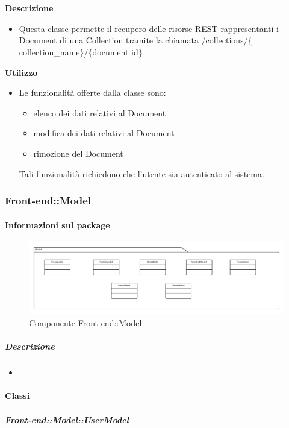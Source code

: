 \begin{itemize}
        \textbf{\\ \\ Descrizione} 
          \begin{itemize}
            \item[] Questa classe permette il recupero delle risorse REST rappresentanti i Document di una Collection tramite la chiamata /collections/$\{$collection_name$\}$/$\{$document id$\}$
          \end{itemize}      
        \textbf{Utilizzo}  
          \begin{itemize}
            \item[] Le funzionalità offerte dalla classe sono: 
\begin{itemize} 
\item elenco dei dati relativi al Document 
\item modifica dei dati relativi al Document
\item rimozione del Document 
\end{itemize} 
Tali funzionalità richiedono che l'utente sia autenticato al sistema.
          \end{itemize}
  \subsubsection{Front-end::Model}
  \paragraph{Informazioni sul package}
    \begin{figure}[H] 
      \begin{center} 
        \includegraphics[width=\textwidth]{packages/Front-end::Model.png}  
        \caption{Componente Front-end::Model}
      \end{center}  
    \end{figure} 
  \subparagraph{Descrizione} 
    \begin{itemize}
    \item[] 
    \end{itemize} 
    \paragraph{Classi}
      \subparagraph{Front-end::Model::UserModel}
        

\end{itemize}
